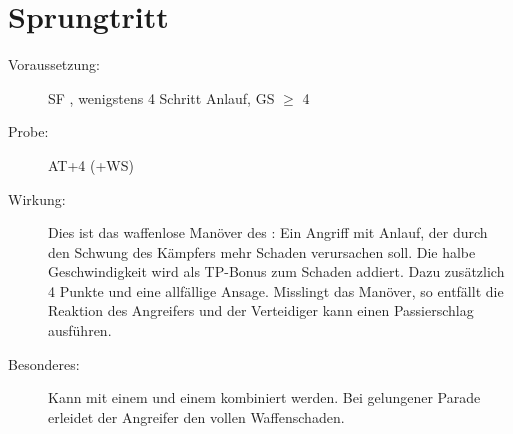 \section{Sprungtritt}
\label{uAT.sprungtritt}
\begin{description}
    \item[Voraussetzung:]
        SF , wenigstens 4 Schritt Anlauf, GS\textrm{ ${\geq}$ 4}
    \item[Probe:]
        AT+4 (+WS)
    \item[Wirkung:]
        Dies ist das waffenlose Manöver des :
        Ein Angriff mit Anlauf, der durch den Schwung des Kämpfers mehr Schaden verursachen soll.
        Die halbe Geschwindigkeit wird als TP-Bonus zum Schaden addiert.
        Dazu zusätzlich 4 Punkte und eine allfällige Ansage.
        Misslingt das Manöver, so entfällt die Reaktion des Angreifers und der Verteidiger kann einen Passierschlag ausführen.
    \item[Besonderes:]
        Kann mit einem  und einem  kombiniert werden.
        Bei gelungener Parade erleidet der Angreifer den vollen Waffenschaden.
\end{description}
